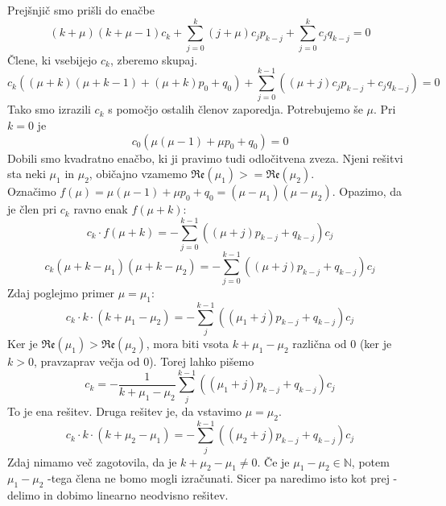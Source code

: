 \documentclass[a4paper]{article}
\newcommand{\N}{\mathbb{N}}
\begin{document}
Prejšnjič smo prišli do enačbe
$$(k+\mu)(k+\mu-1)c_k + \sum_{j=0}^{k}(j + \mu)c_jp_{k-j} + \sum_{j=0}^{k}c_jq_{k-j} = 0$$
Člene, ki vsebijejo $c_k$, zberemo skupaj.
$$c_k\left((\mu + k)(\mu + k - 1) + (\mu + k)p_0 + q_0\right) + \sum_{j=0}^{k-1}\left((\mu + j)c_jp_{k-j} + c_jq_{k-j}\right) = 0$$
Tako smo izrazili $c_k$ s pomočjo ostalih členov zaporedja. Potrebujemo še $\mu$. Pri $k=0$ je
$$c_0\left(\mu(\mu - 1) + \mu p_0 + q_0\right) = 0$$
Dobili smo kvadratno enačbo, ki ji pravimo tudi odločitvena zveza. Njeni rešitvi sta neki $\mu_1$ in $\mu_2$,
običajno vzamemo $\mathfrak{Re}(\mu_1) >= \mathfrak{Re}(\mu_2)$. \\
Označimo $f(\mu) = \mu(\mu - 1) + \mu p_0 + q_0 = (\mu - \mu_1)(\mu - \mu_2)$. Opazimo, da je člen pri $c_k$ ravno enak $f(\mu + k)$:
$$c_k \cdot f(\mu + k) = -\sum_{j=0}^{k-1} \left((\mu + j) p_{k-j} + q_{k-j}\right)c_j$$
$$c_k(\mu + k - \mu_1)(\mu + k - \mu_2) = -\sum_{j=0}^{k-1} \left((\mu + j) p_{k-j} + q_{k-j}\right)c_j$$
Zdaj poglejmo primer $\mu = \mu_1$:
$$c_k\cdot k \cdot \left(k + \mu_1 - \mu_2\right) = -\sum_{j}^{k-1}\left((\mu_1 + j)p_{k-j} + q_{k-j}\right)c_j$$
Ker je $\mathfrak{Re}(\mu_1) > \mathfrak{Re}(\mu_2)$, mora biti vsota $k + \mu_1 - \mu_2$ različna od 0 (ker je $k>0$, pravzaprav večja od 0).
Torej lahko pišemo
$$c_k = -\frac{1}{k + \mu_1 - \mu_2} \sum_{j}^{k-1}\left((\mu_1 + j)p_{k-j} + q_{k-j}\right)c_j$$
To je ena rešitev. Druga rešitev je, da vstavimo $\mu = \mu_2$.
$$c_k\cdot k \cdot \left(k + \mu_2 - \mu_1\right) = -\sum_{j}^{k-1}\left((\mu_2 + j)p_{k-j} + q_{k-j}\right)c_j$$
Zdaj nimamo več zagotovila, da je $k + \mu_2 - \mu_1 \neq 0$. Če je $\mu_1 - \mu_2 \in \N$, potem $\mu_1 - \mu_2$ -tega 
člena ne bomo mogli izračunati. Sicer pa naredimo isto kot prej - delimo in dobimo linearno neodvisno rešitev.
\end{document}
